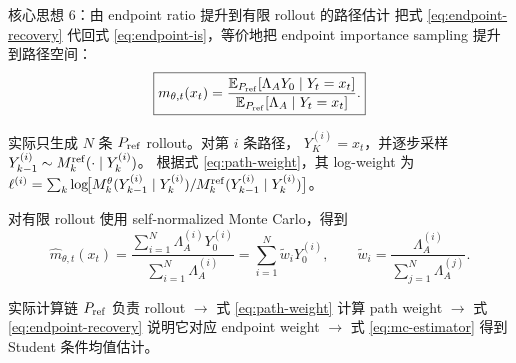 \documentclass[10pt,aspectratio=169]{beamer}
\newcommand{\E}{\mathbb E}
\begin{document}
\begin{frame}{核心思想 6：由 endpoint ratio 提升到有限 rollout 的路径估计}
\small
把式 \eqref{eq:endpoint-recovery} 代回式 \eqref{eq:endpoint-is}，等价地把 endpoint importance sampling 提升到路径空间：
\begin{equation}
\boxed{
m_{\theta,t}(x_t)
=
\frac{
\E_{P_{\rm ref}}[\Lambda_A Y_0\mid Y_t=x_t]
}{
\E_{P_{\rm ref}}[\Lambda_A\mid Y_t=x_t]
}.
}
\label{eq:path-identity}
\end{equation}

实际只生成 $N$ 条 $P_{\rm ref}$ rollout。对第 $i$ 条路径，
$Y_K^{(i)}=x_t$，并逐步采样
$Y_{k-1}^{(i)}\sim M_k^{\rm ref}(\cdot\mid Y_k^{(i)})$。
根据式 \eqref{eq:path-weight}，其 log-weight 为
$\ell^{(i)}=\sum_k\log\!\bigl[M_k^\theta(Y_{k-1}^{(i)}\mid Y_k^{(i)})/
M_k^{\rm ref}(Y_{k-1}^{(i)}\mid Y_k^{(i)})\bigr]$。

对有限 rollout 使用 self-normalized Monte Carlo，得到
\begin{equation}
\boxed{
\widehat m_{\theta,t}(x_t)
=
\frac{\sum_{i=1}^{N}\Lambda_A^{(i)}Y_0^{(i)}}
     {\sum_{i=1}^{N}\Lambda_A^{(i)}}
=
\sum_{i=1}^{N}\widetilde w_iY_0^{(i)},
\qquad
\widetilde w_i
=
\frac{\Lambda_A^{(i)}}{\sum_{j=1}^{N}\Lambda_A^{(j)}} .
}
\label{eq:mc-estimator}
\end{equation}

\begin{exampleblock}{实际计算链}
$P_{\rm ref}$ 负责 rollout $\rightarrow$ 式 \eqref{eq:path-weight} 计算 path weight
$\rightarrow$ 式 \eqref{eq:endpoint-recovery} 说明它对应 endpoint weight $\rightarrow$
式 \eqref{eq:mc-estimator} 得到 Student 条件均值估计。
\end{exampleblock}
\end{frame}
\end{document}
